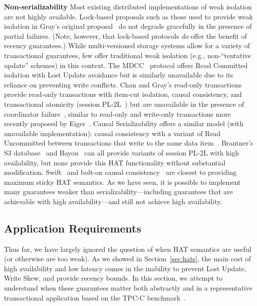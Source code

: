 \vspace{.5em}\noindent\textbf{Non-serializability} Most existing
distributed implementations of weak isolation are not highly
available. Lock-based proposals such as those used to provide weak
isolation in Gray's original proposal~\cite{gray-isolation} do not
degrade gracefully in the presence of partial failures. (Note,
however, that lock-based protocols \textit{do} offer the benefit of
recency guarantees.) While multi-versioned storage systems allow for a
variety of transactional guarantees, few offer traditional weak
isolation (e.g., non-``tentative update'' schemes) in this context.
The MDCC~\cite{mdcc} protocol offers Read Committed isolation with
Lost Update avoidance but is similarly unavailable due to its reliance
on preventing write conflicts. Chan and Gray's read-only transactions
provide read-only transactions with item-cut isolation, causal
consistency, and transactional atomicity (session PL-2L~\cite{adya})
but are unavailable in the presence of coordinator
failure~\cite{readonly}, similar to read-only and write-only
transactions more recently proposed by Eiger~\cite{eiger}. Causal
Serializability offers a similar model (with unavailable
implementation): causal consistency with a variant of Read Uncommitted
between transactions that write to the same data
item~\cite{raynal-causal}.  Brantner's S3 database~\cite{kraska-s3}
and Bayou~\cite{sessionguarantees} can all provide variants of session
PL-2L with high availability, but none provide this HAT functionality
without substantial modification. Swift~\cite{swift} and bolt-on
causal consistency~\cite{bolton} are closest to providing maximum
sticky HAT semantics. As we have seen, it is possible to implement many
guarantees weaker than serializability---including guarantees that are
achievable with high availability---and still not achieve high
availability.

\subsection{Application Requirements}

Thus far, we have largely ignored the question of when HAT semantics
are useful (or otherwise are too weak). As we showed in
Section~\ref{sec:hats}, the main cost of high availability and low
latency comes in the inability to prevent Lost Update, Write Skew, and
provide recency bounds. In this section, we attempt to understand when
these guarantees matter both abstractly and in a representative
transactional application based on the TPC-C benchmark~\cite{tpcc}.

